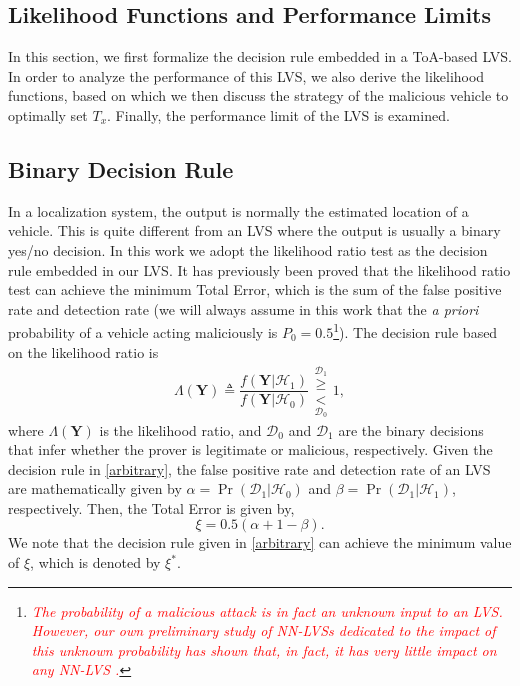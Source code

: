 \documentclass[journal]{IEEEtran}
\newcommand{\Hnull}{\mathcal{H}_0}
\newcommand{\Halt}{\mathcal{H}_1}
\newcommand{\Honull}{\mathcal{{D}}_0}
\newcommand{\Hoalt}{\mathcal{{D}}_1}
\begin{document}
\subsection{Likelihood Functions and Performance Limits}

In this section, we first formalize the decision rule embedded in a ToA-based LVS. In order to  analyze the performance of this LVS, we also derive the likelihood functions, based on which we then discuss the strategy of the malicious vehicle to optimally set $T_x$. Finally, the performance limit of the LVS is examined.

\subsection{Binary Decision Rule}

In a localization system, the output is normally the estimated location of a vehicle. This is quite different from an LVS where the
 output is usually a binary yes/no decision. In this work we adopt the likelihood ratio test as the decision rule embedded in our LVS.  It has previously been proved that the likelihood ratio test can achieve the minimum Total Error, which is the sum of the false positive rate and detection rate (we will always assume in this work that the  \emph{a priori} probability of a vehicle acting maliciously is $P_0=0.5$\footnote{\textcolor{red}{\textit{The probability of a malicious attack is in fact an unknown input to an LVS. However, our own preliminary  study of  NN-LVSs dedicated to the impact of this unknown probability has shown that, in fact, it has very little impact on any NN-LVS \cite{Ihsan_ICC}.}}})\cite{neyman1933problem}. The decision rule based on the likelihood ratio is
\begin{equation}\label{arbitrary}
\Lambda\left(\mathbf{Y}\right) \triangleq \frac{f\left(\mathbf{Y}|\Halt\right)}{f\left(\mathbf{Y}|\Hnull\right)} \begin{array}{c}
\overset{\Hoalt}{\geq} \\
\underset{\Honull}{<}
\end{array}%
1,
\end{equation}
where $\Lambda\left(\mathbf{Y}\right)$ is the likelihood ratio, and $\Honull$ and $\Hoalt$ are the binary decisions that infer whether the prover is legitimate or malicious, respectively. Given the decision rule in \eqref{arbitrary}, the false positive rate and detection rate of an LVS are mathematically given by $\alpha = \Pr(\Hoalt|\Hnull)$ and $\beta = \Pr(\Hoalt|\Halt)$, respectively. Then, the Total Error is given by,
\begin{equation}\label{TE_old}
\xi = 0.5(\alpha + 1 - \beta).
\end{equation}
We note that the decision rule given in \eqref{arbitrary} can achieve the minimum value of $\xi$, which is denoted by $\xi^{\ast}$.
\end{document}
